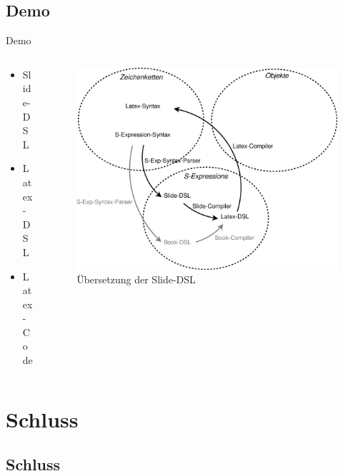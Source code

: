 \documentclass{beamer}
\newcommand{\pfeil}{\item[$\Rightarrow$]}
\begin{document}
\subsection{Demo}

\begin{frame}{Demo}
  \begin{columns}
    \begin{column}{4cm}
      \begin{itemize}
      \item Slide-DSL
      \pfeil Latex-DSL
      \pfeil Latex-Code
      \end{itemize}
    \end{column}
    \begin{column}{6cm}
      \begin{figure}
        \includegraphics[scale=0.2]{images/magicl_latex_compiler}
        \caption{Übersetzung der Slide-DSL}    
      \end{figure}
    \end{column}
  \end{columns}
\end{frame}

\section{Schluss}
\subsection{Schluss}
\end{document}
